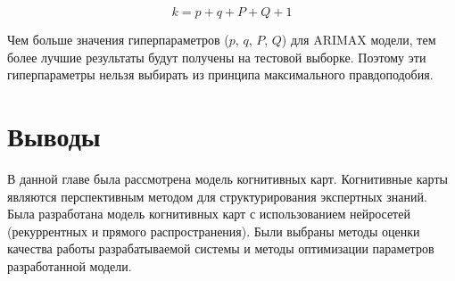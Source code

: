 \begin{equation}\label{eq:params_amount_akaike}
	k = p + q + P + Q + 1
\end{equation}

Чем больше значения гиперпараметров ($ p $, $ q $, $ P $, $ Q $) для ARIMAX модели, тем более лучшие
результаты будут получены на тестовой выборке. Поэтому эти гиперпараметры нельзя
выбирать из принципа максимального правдоподобия.

\section{Выводы}

В данной главе была рассмотрена модель когнитивных карт.
Когнитивные карты являются перспективным методом для структурирования
экспертных знаний.
Была разработана модель когнитивных карт с использованием нейросетей (рекуррентных и прямого распространения).
Были выбраны методы оценки качества работы разрабатываемой системы
и методы оптимизации параметров разработанной модели.
